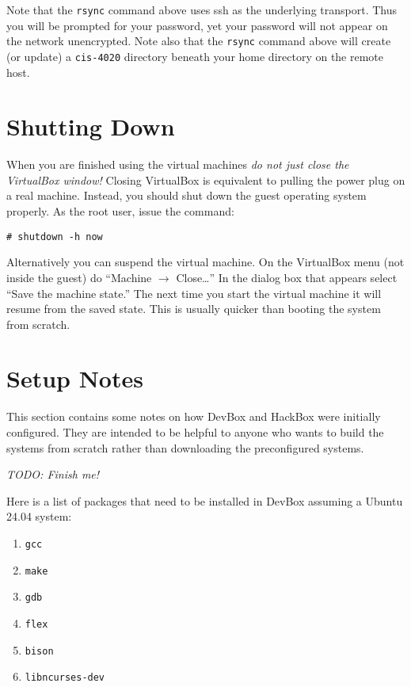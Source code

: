 \documentclass[twocolumn]{article}
\begin{document}
Note that the \texttt{rsync} command above uses ssh as the underlying transport. Thus you will
be prompted for your password, yet your password will not appear on the network unencrypted.
Note also that the \texttt{rsync} command above will create (or update) a \texttt{cis-4020}
directory beneath your home directory on the remote host.

\section{Shutting Down}

When you are finished using the virtual machines \emph{do not just close the VirtualBox window!}
Closing VirtualBox is equivalent to pulling the power plug on a real machine. Instead, you
should shut down the guest operating system properly. As the root user, issue the command:
\begin{Verbatim}
# shutdown -h now
\end{Verbatim}

Alternatively you can suspend the virtual machine. On the VirtualBox menu (not inside the guest)
do ``Machine $\rightarrow$ Close\ldots'' In the dialog box that appears select ``Save the
machine state.'' The next time you start the virtual machine it will resume from the saved
state. This is usually quicker than booting the system from scratch.

\section{Setup Notes}

This section contains some notes on how DevBox and HackBox were initially configured. They are
intended to be helpful to anyone who wants to build the systems from scratch rather than
downloading the preconfigured systems.

\textit{TODO: Finish me!}

Here is a list of packages that need to be installed in DevBox assuming a Ubuntu 24.04 system:
\begin{enumerate}
  \item \texttt{gcc}
  \item \texttt{make}
  \item \texttt{gdb}
  \item \texttt{flex}
  \item \texttt{bison}
  \item \texttt{libncurses-dev}
\end{enumerate}
\end{document}
